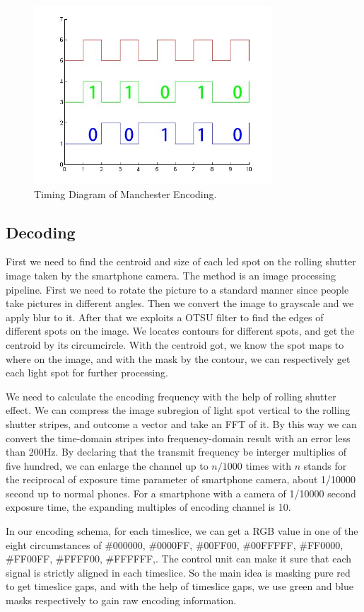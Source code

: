 \documentclass[conference]{IEEEtran}
\begin{document}
	\begin{figure}
		\centering
		\includegraphics[width=3.5in]{../img.origin/fig3.jpg}
		\caption{Timing Diagram of Manchester Encoding.}
		\label{fig_3}
	\end{figure}

\subsection{\textbf{Decoding}}
First we need to find the centroid and size of each led spot on the rolling shutter image taken by the smartphone camera. The method is an image processing pipeline. First we need to rotate the picture to a standard manner since people take pictures in different angles. Then we convert the image to grayscale and we apply blur to it. After that we exploits a OTSU filter to find the edges of different spots on the image. We locates contours for different spots, and get the centroid by its circumcircle. With the centroid got, we know the spot maps to where on the image, and with the mask by the contour, we can respectively get each light spot for further processing. 

We need to calculate the encoding frequency with the help of rolling shutter effect. We can compress the image subregion of light spot vertical to the rolling shutter stripes, and outcome a vector and take an FFT of it. By this way we can convert the time-domain stripes into frequency-domain result with an error less than 200Hz. By declaring that the transmit frequency be interger multiplies of five hundred, we can enlarge the channel up to $n/1000$ times with $n$ stands for the reciprocal of exposure time parameter of smartphone camera, about 1/10000 second up to normal phones. For a smartphone with a camera of 1/10000 second exposure time, the expanding multiples of encoding channel is 10.  

In our encoding schema, for each timeslice, we can get a RGB value in one of the eight circumstances of {\#000000, \#0000FF, \#00FF00, \#00FFFFF, \#FF0000, \#FF00FF, \#FFFF00, \#FFFFFF,}. The control unit can make it sure that each signal is strictly aligned in each timeslice. So the main idea is masking pure red to get timeslice gaps, and with the help of timeslice gaps, we use green and blue masks respectively to gain raw encoding information. 
\end{document}
